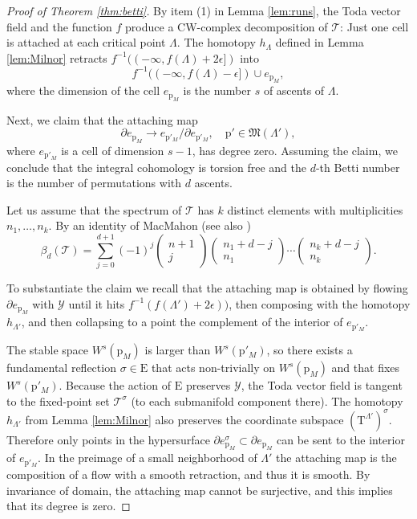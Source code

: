 \documentclass[reqno]{amsart}
\newcommand{\p}{\mathrm{p}}
\newcommand{\cT}{\mathcal{T}}
\newcommand{\cY}{\mathcal{Y}}
\newcommand{\E}{\mathrm{E}}
\newcommand{\T}{\mathbb{T}}
\renewcommand{\T}{\mathrm{T}}
\begin{document}
\begin{proof}[Proof of Theorem \ref{thm:betti}] By item (1) in Lemma \ref{lem:runs},  the Toda vector field and the function $f$ produce a CW-complex decomposition of $\cT$: Just one cell is attached at each critical point $\Lambda$. The homotopy $h_\Lambda$ defined in Lemma  \ref{lem:Milnor} retracts $f^{-1}((-\infty,f(\Lambda)+2\epsilon])$ into
\[f^{-1}((-\infty, f(\Lambda)-\epsilon])\cup e_{\p_M},\]
where the dimension of the cell $e_{\p_M}$ is  the number $s$ of ascents of $\Lambda$.

Next, we claim that the attaching map
\[\partial e_{\p_M}\to e_{\p'_M}/\partial e_{\p'_M},\quad \p'\in \mathfrak{M}(\Lambda'),\]
where  $e_{\p'_M}$ is a cell of dimension $s-1$, has degree zero. Assuming the claim,
we conclude  that the integral cohomology is torsion free and the $d$-th Betti number is the number of permutations with $d$ ascents.

Let us assume that the spectrum of $\cT$ has $k$ distinct elements with multiplicities $n_1,\dots,n_k$.
By an identity of MacMahon \cite{MM} (see also \cite[Page 45]{Knu})
 \[\beta_d(\cT)=\sum_{j=0}^{d+1} (-1)^j\begin{pmatrix}n+1\\j\end{pmatrix}\begin{pmatrix}n_1+d-j\\n_1\end{pmatrix}\cdots \begin{pmatrix}n_k+d-j\\n_k\end{pmatrix}.\]

To substantiate the claim we recall that the attaching map is obtained by flowing $\partial e_{\p_M}$ with $\cY$ until it hits $f^{-1}(f(\Lambda')+2\epsilon))$, then composing with the homotopy $h_{\Lambda'}$, and then collapsing to a point the complement of the interior of $e_{\p'_M}$.


The stable space $W^s(\p_M)$ is larger than $W^s(\p'_M)$, so there exists a fundamental reflection $\sigma\in \E$ that acts non-trivially on $W^s(\p_M)$ and that fixes $W^s(\p'_M)$. Because the action of $\E$ preserves $\cY$, the Toda vector field is tangent to the fixed-point set $\cT^\sigma$ (to each submanifold component there). The homotopy $h_{\Lambda'}$ from Lemma \ref{lem:Milnor} also preserves the coordinate subspace ${(\T^{\Lambda'})}^\sigma$. Therefore only points in the hypersurface $\partial {e_{\p_M}^\sigma}\subset \partial e_{\p_M}$ can be sent to the interior of $e_{\p'_M}$. In the preimage of a small neighborhood of $\Lambda'$ the attaching map is the composition of a flow with a smooth retraction, and thus it is smooth. By invariance of domain, the attaching map cannot be surjective, and this implies  that its degree is zero.
\end{proof}
\end{document}
